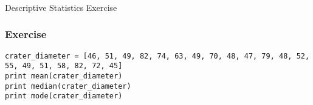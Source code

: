 

\begin{frame}[fragile]\frametitle{}
\begin{center}
{\Large Descriptive Statistics Exercise}
\end{center}
\end{frame}

\begin{frame}[fragile]\frametitle{Exercise}	
\begin{lstlisting}
crater_diameter = [46, 51, 49, 82, 74, 63, 49, 70, 48, 47, 79, 48, 52, 55, 49, 51, 58, 82, 72, 45]
print mean(crater_diameter)
print median(crater_diameter)
print mode(crater_diameter)
\end{lstlisting}

\end{frame}
